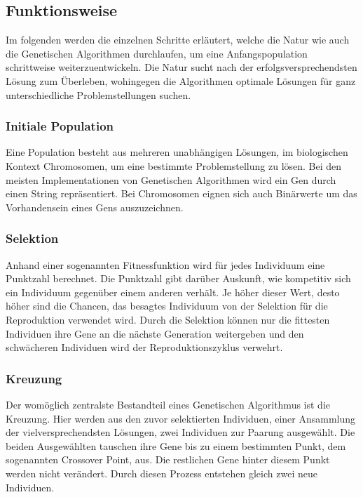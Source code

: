 \subsection{Funktionsweise}

Im folgenden werden die einzelnen Schritte erläutert, welche die Natur wie auch die Genetischen
Algorithmen durchlaufen, um eine Anfangspopulation schrittweise weiterzuentwickeln. Die Natur
sucht nach der erfolgsversprechendsten Lösung zum Überleben, wohingegen die Algorithmen
optimale Lösungen für ganz unterschiedliche Problemstellungen suchen. \cite{Mal17}

\subsubsection{Initiale Population}
Eine Population besteht aus mehreren unabhängigen Lösungen, im biologischen Kontext Chromosomen,
um eine bestimmte Problemstellung zu lösen. Bei den meisten Implementationen von Genetischen
Algorithmen wird ein Gen durch einen String repräsentiert. Bei Chromosomen eignen sich auch
Binärwerte um das Vorhandensein eines Gens auszuzeichnen.

\subsubsection{Selektion}
Anhand einer sogenannten Fitnessfunktion wird für jedes Individuum eine Punktzahl berechnet.
Die Punktzahl gibt darüber Auskunft, wie kompetitiv sich ein Individuum gegenüber einem anderen
verhält. Je höher dieser Wert, desto höher sind die Chancen, das besagtes Individuum von der
Selektion für die Reproduktion verwendet wird. Durch die Selektion können nur die fittesten
Individuen ihre Gene an die nächste Generation weitergeben und den schwächeren Individuen wird
der Reproduktionszyklus verwehrt.

\subsubsection{Kreuzung}
Der womöglich zentralste Bestandteil eines Genetischen Algorithmus ist die Kreuzung. Hier werden
aus den zuvor selektierten Individuen, einer Ansammlung der vielversprechendsten Lösungen, zwei
Individuen zur Paarung ausgewählt. Die beiden Ausgewählten tauschen ihre Gene bis zu einem bestimmten
Punkt, dem sogenannten Crossover Point, aus. Die restlichen Gene hinter diesem Punkt werden nicht
verändert. Durch diesen Prozess entstehen gleich zwei neue Individuen.


